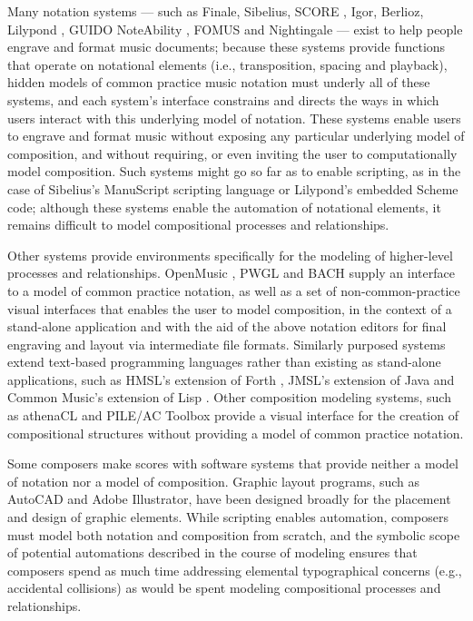 \documentclass{article}
\begin{document}
Many notation systems --- such as Finale, Sibelius, SCORE \cite{Smith:1972mw},
Igor, Berlioz, Lilypond \cite{Nienhuys:2003ve}, GUIDO \cite{Hoos:1998bd}
NoteAbility \cite{hamel1noteability}, FOMUS \cite{Psenicka2006,Psenicka2009} and Nightingale --- exist to help people engrave and format music documents; because these systems provide functions
that operate on notational elements (i.e., transposition, spacing and
playback), hidden models of common practice music notation must underly all of
these systems, and each system's interface constrains and directs the ways in
which users interact with this underlying model of notation. These systems
enable users to engrave and format music without exposing any particular
underlying model of composition, and without requiring, or even inviting the
user to computationally model composition. Such systems might go so far as to
enable scripting, as in the case of Sibelius's ManuScript \cite{Technology:qc}
scripting language or Lilypond's embedded Scheme code; although these systems
enable the automation of notational elements, it remains difficult to model
compositional processes and relationships.

Other systems provide environments specifically for the modeling of
higher-level processes and relationships. OpenMusic \cite{Assayag:1999sw}, PWGL
\cite{Laurson:2009qf} and BACH \cite{agostini2013real} supply an interface to
a model of common practice notation, as well as a set of non-common-practice visual interfaces that enables the user to model composition, in the context of a stand-alone application and with the aid of the above notation editors for final engraving and layout via intermediate file formats. Similarly purposed systems extend text-based programming languages rather than existing as stand-alone applications, such as HMSL's extension of Forth \cite{Polansky:1990fk}, JMSL's extension of Java \cite{didkovsky2001java} and Common Music's extension of Lisp \cite{taube1991common}. Other composition modeling systems, such as athenaCL \cite{Ariza2005} and PILE/AC Toolbox \cite{Berg1979} provide a visual interface for the creation of compositional structures without providing a model of common practice notation.

Some composers make scores with software systems that provide neither a model
of notation nor a model of composition. Graphic layout programs, such as
AutoCAD and Adobe Illustrator, have been designed broadly for the placement and
design of graphic elements. While scripting enables automation, composers must
model both notation and composition from scratch, and the symbolic scope of
potential automations described in the course of modeling ensures that
composers spend as much time addressing elemental typographical concerns (e.g.,
accidental collisions) as would be spent modeling compositional processes and
relationships.
\end{document}
